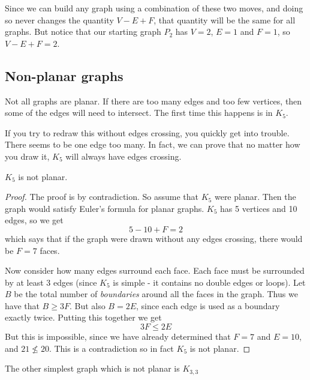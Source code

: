 \documentclass[12pt]{article}
\begin{document}
Since we can build any graph using a combination of these two moves, and doing so never changes the quantity $V - E + F$, that quantity will be the same for all graphs.  But notice that our starting graph $P_2$ has $V = 2$, $E = 1$ and $F = 1$, so $V - E + F = 2$.

\subsection*{Non-planar graphs}

Not all graphs are planar.  If there are too many edges and too few vertices, then some of the edges will need to intersect.  The first time this happens is in $K_5$.

\begin{center}
\end{center}

If you try to redraw this without edges crossing, you quickly get into trouble.  There seems to be one edge too many.  In fact, we can prove that no matter how you draw it, $K_5$ will always have edges crossing.

\begin{theorem}
  $K_5$ is not planar.
\end{theorem}

\begin{proof}
  The proof is by contradiction.  So assume that $K_5$ were planar.  Then the graph would satisfy Euler's formula for planar graphs.  $K_5$ has 5 vertices and 10 edges, so we get 
  \[5 - 10 + F = 2\]
  which says that if the graph were drawn without any edges crossing, there would be $F = 7$ faces.
  
  Now consider how many edges surround each face.  Each face must be surrounded by at least 3 edges (since $K_5$ is simple - it contains no double edges or loops).  Let $B$ be the total number of {\em boundaries} around all the faces in the graph.  Thus we have that $B \ge 3F$.  But also $B = 2E$, since each edge is used as a boundary exactly twice.  Putting this together we get
  \[3F \le 2E\]
  But this is impossible, since we have already determined that $F = 7$ and $E = 10$, and $21 \not\le 20$.  This is a contradiction so in fact $K_5$ is not planar.
\end{proof}

The other simplest graph which is not planar is $K_{3,3}$
    \begin{center}
    \end{center}
    
\end{document}
